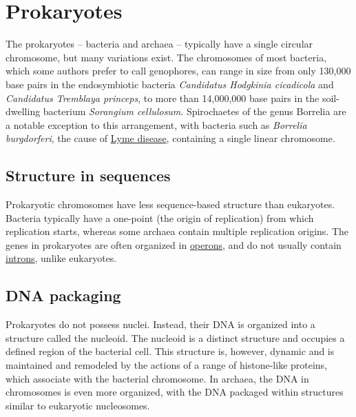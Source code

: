 \hypertarget{prokaryotes}{%
\section{Prokaryotes}\label{prokaryotes}}

The prokaryotes -- bacteria and archaea -- typically have a single circular chromosome, but many variations exist. The chromosomes of most bacteria, which some authors prefer to call genophores, can range in size from only 130,000 base pairs in the endosymbiotic bacteria \emph{Candidatus Hodgkinia cicadicola} and \emph{Candidatus Tremblaya princeps}, to more than 14,000,000 base pairs in the soil-dwelling bacterium \emph{Sorangium cellulosum}. Spirochaetes of the genus Borrelia are a notable exception to this arrangement, with bacteria such as \emph{Borrelia burgdorferi}, the cause of \href{https://en.wikipedia.org/wiki/Lyme_disease}{Lyme disease}, containing a single linear chromosome.

\hypertarget{structure-in-sequences}{%
\subsection{Structure in sequences}\label{structure-in-sequences}}

Prokaryotic chromosomes have less sequence-based structure than eukaryotes. Bacteria typically have a one-point (the origin of replication) from which replication starts, whereas some archaea contain multiple replication origins. The genes in prokaryotes are often organized in \href{https://en.wikipedia.org/wiki/Operon}{operons}, and do not usually contain \href{https://en.wikipedia.org/wiki/Intron}{introns}, unlike eukaryotes.

\hypertarget{dna-packaging}{%
\subsection{DNA packaging}\label{dna-packaging}}

Prokaryotes do not possess nuclei. Instead, their DNA is organized into a structure called the nucleoid. The nucleoid is a distinct structure and occupies a defined region of the bacterial cell. This structure is, however, dynamic and is maintained and remodeled by the actions of a range of histone-like proteins, which associate with the bacterial chromosome. In archaea, the DNA in chromosomes is even more organized, with the DNA packaged within structures similar to eukaryotic nucleosomes.

